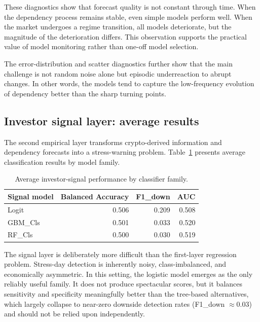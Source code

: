 These diagnostics show that forecast quality is not constant through time. When the dependency process remains stable, even simple models perform well. When the market undergoes a regime transition, all models deteriorate, but the magnitude of the deterioration differs. This observation supports the practical value of model monitoring rather than one-off model selection.

The error-distribution and scatter diagnostics further show that the main challenge is not random noise alone but episodic underreaction to abrupt changes. In other words, the models tend to capture the low-frequency evolution of dependency better than the sharp turning points.

\subsection{Investor signal layer: average results}

The second empirical layer transforms crypto-derived information and dependency forecasts into a stress-warning problem. Table~\ref{tab:signal_summary} presents average classification results by model family.

\begin{table}[H]
    \centering
    \caption{Average investor-signal performance by classifier family.}
    \label{tab:signal_summary}
    \begin{tabular}{lrrr}
        \toprule
        Signal model & Balanced Accuracy & F1\_down & AUC \\
        \midrule
        Logit & 0.506 & 0.209 & 0.508 \\
        GBM\_Cls & 0.501 & 0.033 & 0.520 \\
        RF\_Cls & 0.500 & 0.030 & 0.519 \\
        \bottomrule
    \end{tabular}
\end{table}

The signal layer is deliberately more difficult than the first-layer regression problem. Stress-day detection is inherently noisy, class-imbalanced, and economically asymmetric. In this setting, the logistic model emerges as the only reliably useful family. It does not produce spectacular scores, but it balances sensitivity and specificity meaningfully better than the tree-based alternatives, which largely collapse to near-zero downside detection rates (F1\_down $\approx 0.03$) and should not be relied upon independently.

